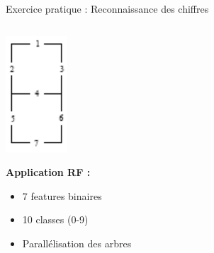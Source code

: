 \documentclass{beamer}
\begin{document}
\begin{frame}{Exercice pratique : Reconnaissance des chiffres}
\begin{columns}
\begin{column}{0.4\textwidth}
				\includegraphics[width=\textwidth]{assets/digits_segment.png}
				
				\vspace{0.5cm}
				\textbf{Application RF :}
				\begin{itemize}
					\item 7 features binaires
					\item 10 classes (0-9)
					\item Parallélisation des arbres
				\end{itemize}
			\end{column}
		\end{columns}
	\end{frame}
	
\end{document}

